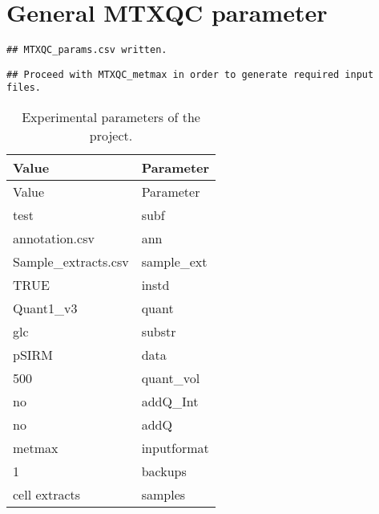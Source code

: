 \documentclass[10pt,]{article}
\begin{document}
\section{General MTXQC parameter}\label{general-mtxqc-parameter}

\begin{verbatim}
## MTXQC_params.csv written.
\end{verbatim}

\begin{verbatim}
## Proceed with MTXQC_metmax in order to generate required input files.
\end{verbatim}

\begin{longtable}[]{@{}ll@{}}
\caption{Experimental parameters of the project.}\tabularnewline
\toprule
Value & Parameter\tabularnewline
\midrule
\endfirsthead
\toprule
Value & Parameter\tabularnewline
\midrule
\endhead
test & subf\tabularnewline
annotation.csv & ann\tabularnewline
Sample\_extracts.csv & sample\_ext\tabularnewline
TRUE & instd\tabularnewline
Quant1\_v3 & quant\tabularnewline
glc & substr\tabularnewline
pSIRM & data\tabularnewline
500 & quant\_vol\tabularnewline
no & addQ\_Int\tabularnewline
no & addQ\tabularnewline
metmax & inputformat\tabularnewline
1 & backups\tabularnewline
cell extracts & samples\tabularnewline
\bottomrule
\end{longtable}
\newpage
\singlespacing 
\end{document}
